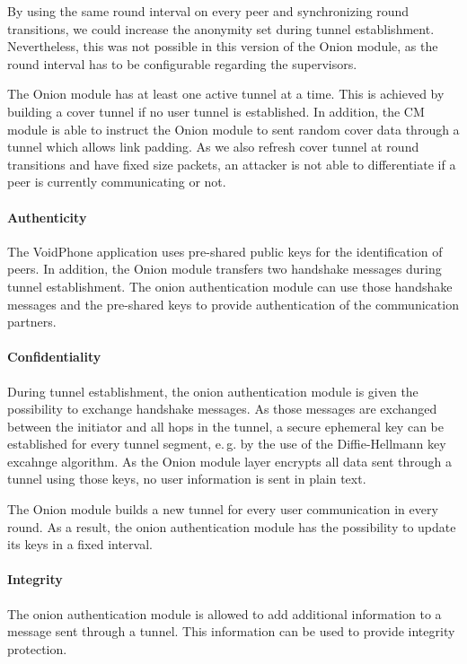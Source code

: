 \documentclass[paper=letter, fontsize=12pt]{article}
\begin{document}
By using the same round interval on every peer and synchronizing round transitions, we could increase the anonymity set during tunnel establishment.
Nevertheless, this was not possible in this version of the Onion module, as the round interval has to be configurable regarding the supervisors.

The Onion module has at least one active tunnel at a time.
This is achieved by building a cover tunnel if no user tunnel is established.
In addition, the CM module is able to instruct the Onion module to sent random cover data through a tunnel which allows link padding.
As we also refresh cover tunnel at round transitions and have fixed size packets, an attacker is not able to differentiate if a peer is currently communicating or not.


\paragraph{Authenticity}
The VoidPhone application uses pre-shared public keys for the identification of peers.
In addition, the Onion module transfers two handshake messages during tunnel establishment.
The onion authentication module can use those handshake messages and the pre-shared keys to provide authentication of the communication partners.

\paragraph{Confidentiality}
During tunnel establishment, the onion authentication module is given the possibility to exchange handshake messages.
As those messages are exchanged between the initiator and all hops in the tunnel, a secure ephemeral key can be established for every tunnel segment, e.\,g. by the use of the Diffie-Hellmann key excahnge algorithm.
As the Onion module layer encrypts all data sent through a tunnel using those keys, no user information is sent in plain text.

The Onion module builds a new tunnel for every user communication in every round.
As a result, the onion authentication module has the possibility to update its keys in a fixed interval.

\paragraph{Integrity}
The onion authentication module is allowed to add additional information to a message sent through a tunnel.
This information can be used to provide integrity protection.
\end{document}
